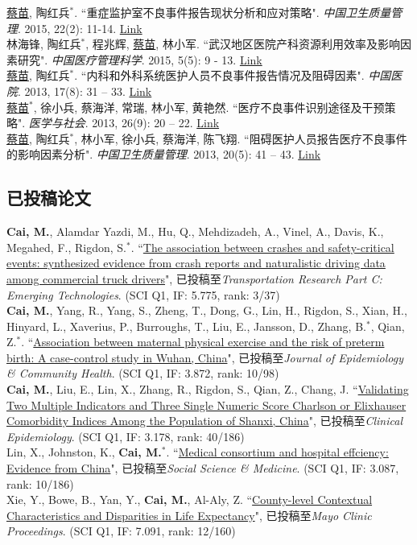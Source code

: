 \documentclass[11pt, a4paper]{article}
\newcommand{\years}[1]{\marginnote{\scriptsize #1}}
\begin{document}
\years{2015}\underline{蔡苗}, 陶红兵$^\ast$. ``重症监护室不良事件报告现状分析和应对策略". \emph{中国卫生质量管理}. 2015, 22(2): 11-14. \href{http://www.cnki.com.cn/Article/CJFDTOTAL-WSJG201502008.htm}{Link}\\
\years{2015} 林海锋, 陶红兵$^\ast$, 程兆辉, \underline{蔡苗}, 林小军. ``武汉地区医院产科资源利用效率及影响因素研究". \emph{中国医疗管理科学}. 2015, 5(5): 9 - 13. \href{http://www.cnki.com.cn/Article/CJFDTOTAL-YLGL201505004.htm}{Link}\\
\years{2013}\underline{蔡苗}, 陶红兵$^\ast$. ``内科和外科系统医护人员不良事件报告情况及阻碍因素". \emph{中国医院}. 2013, 17(8): 31 – 33. \href{http://www.cnki.com.cn/Article/CJFDTOTAL-ZGYU201308016.htm}{Link}\\
\years{2013}\underline{蔡苗}$^\ast$,  徐小兵, 蔡海洋, 常瑞, 林小军, 黄艳然. ``医疗不良事件识别途径及干预策略". \emph{医学与社会}. 2013, 26(9): 20 – 22. \href{http://www.cnki.com.cn/Article/CJFDTOTAL-YXSH201309007.htm}{Link}\\
\years{2013}\underline{蔡苗}, 陶红兵$^\ast$, 林小军, 徐小兵, 蔡海洋, 陈飞翔. ``阻碍医护人员报告医疗不良事件的影响因素分析". \emph{中国卫生质量管理}. 2013, 20(5): 41 – 43. \href{http://www.cqvip.com/qk/98273x/201305/47221843.html}{Link}

\subsection*{已投稿论文}
\noindent
\years{2019}\textbf{Cai, M.}, Alamdar Yazdi, M., Hu, Q., Mehdizadeh, A., Vinel, A., Davis, K., Megahed, F., Rigdon, S.$^\ast$. ``\ul{The association between crashes and safety-critical events: synthesized evidence from crash reports and naturalistic driving data among commercial truck drivers}", 已投稿至\emph{Transportation Research Part C: Emerging Technologies}. (SCI Q1, IF: 5.775, rank: 3/37)\\
\years{2019}\textbf{Cai, M.}, Yang, R., Yang, S., Zheng, T., Dong, G., Lin, H., Rigdon, S., Xian, H., Hinyard, L., Xaverius, P., Burroughs, T., Liu, E., Jansson, D., Zhang, B.$^\ast$, Qian, Z.$^\ast$. ``\ul{Association between maternal physical exercise and the risk of preterm birth: A case-control study in Wuhan, China}", 已投稿至\emph{Journal of Epidemiology \& Community Health}. (SCI Q1, IF: 3.872, rank: 10/98)\\
\years{2019}\textbf{Cai, M.}, Liu, E., Lin, X., Zhang, R., Rigdon, S., Qian, Z., Chang, J. ``\ul{Validating Two Multiple Indicators and Three Single Numeric Score Charlson or Elixhauser Comorbidity Indices Among the Population of Shanxi, China}", 已投稿至\emph{Clinical Epidemiology}. (SCI Q1, IF: 3.178, rank: 40/186)\\
\years{2019}Lin, X., Johnston, K., \textbf{Cai, M.$^*$}. ``\ul{Medical consortium and hospital effciency: Evidence from China}", 已投稿至\emph{Social Science \& Medicine}. (SCI Q1, IF: 3.087, rank: 10/186)\\
\years{2019}Xie, Y., Bowe, B., Yan, Y., \textbf{Cai, M.}, Al-Aly, Z. ``\ul{County-level Contextual Characteristics and Disparities in Life Expectancy}", 已投稿至\emph{Mayo Clinic Proceedings}. (SCI Q1, IF: 7.091, rank: 12/160)
\end{document}
